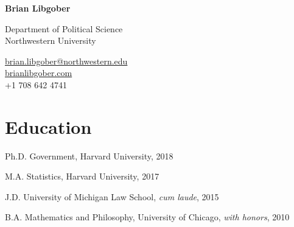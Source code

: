 \documentclass[12pt,letterpaper]{report}
\newcommand{\myname}{Brian Libgober}
\newcommand{\namefont}[1]{{\normalfont\bfseries\Huge{#1}}}
\begin{document}
	\pagestyle{fancy}
	\fancyhf{}
	\renewcommand{\headrulewidth}{0pt}
    \raggedright{}

    \begin{minipage}[t]{0.6\textwidth}
	\raggedright{}
    \namefont{\myname}
	\end{minipage}
	\hfill
    \vspace{1em}
    \begin{minipage}[t]{0.6\textwidth}
        \flushleft{} Department of Political Science \\
         Northwestern University
    \end{minipage}
    \hfill
    \begin{minipage}[t]{0.395\textwidth}
        \flushright{}
        \href{mailto:brian.libgober@northwestern.edu}{brian.libgober@northwestern.edu} \\
        \href{https://brianlibgober.com}{brianlibgober.com} \\
         +1 708 642 4741 \\
    \end{minipage}
    

    \section*{Education}

    \begin{tablist}

        \item[Ph.D.] \tab{}Government, Harvard University, 2018
        \item[M.A.]  \tab{}Statistics, Harvard University, 2017
        \item[J.D.]  \tab{}University of Michigan Law School, \textit{cum laude}, 2015
        \item[B.A.]  \tab{}Mathematics and Philosophy, University of Chicago, \textit{with honors}, 2010

    \end{tablist}
\end{document}
